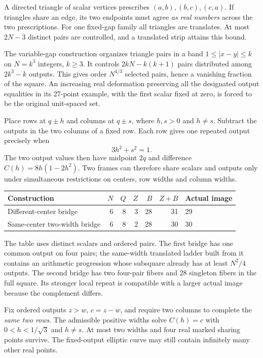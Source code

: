A directed triangle of scalar vertices prescribes $(a,b),(b,c),(c,a)$. If triangles share an edge, its two endpoints must agree \emph{as real numbers} across the two prescriptions. For one fixed-gap family all triangles are translates. At most $2N-3$ distinct pairs are controlled, and a translated strip attains this bound. 

The variable-gap construction organizes triangle pairs in a band $1\le |x-y|\le k$ on $N=k^3$ integers, $k\ge3$. It controls $2kN-k(k+1)$ pairs distributed among $2k^3-k$ outputs. This gives order $N^{4/3}$ selected pairs, hence a vanishing fraction of the square. An increasing real deformation preserving all the designated output equalities in its 27-point example, with the first scalar fixed at zero, is forced to be the original unit-spaced set. 

Place rows at $q\pm h$ and columns at $q\pm s$, where $h,s>0$ and $h\ne s$. Subtract the outputs in the two columns of a fixed row. Each row gives one repeated output precisely when
\[
 3h^2+s^2=1.
\]
The two output values then have midpoint $2q$ and difference $C(h)=8h(1-2h^2)$. Two frames can therefore share scalars and outputs only under simultaneous restrictions on centers, row widths and column widths.

\begin{center}
\begin{tabular}{@{}lrrrrrl@{}}
\toprule
\textbf{Construction} & $N$ & $Q$ & $Z$ & $B$ & $Z+B$ & \textbf{Actual image}\\\midrule
Different-center bridge & 6 & 8 & 3 & 28 & 31 & 29\\
Same-center two-width bridge & 6 & 8 & 2 & 28 & 30 & 30\\\bottomrule
\end{tabular}
\end{center}
The table uses distinct scalars and ordered pairs. The first bridge has one common output on four pairs; the same-width translated ladder built from it contains an arithmetic progression whose subsquare already has at least $N^2/4$ outputs. The second bridge has two four-pair fibers and 28 singleton fibers in the full square. Its stronger local repeat is compatible with a larger actual image because the complement differs. 

Fix ordered outputs $z>w$, $c=z-w$, and require two columns to complete the \emph{same two rows}. The admissible positive widths solve $C(h)=c$ with $0<h<1/\sqrt3$ and $h\ne s$. At most two widths and four real marked sharing points survive. The fixed-output elliptic curve may still contain infinitely many other real points. 

